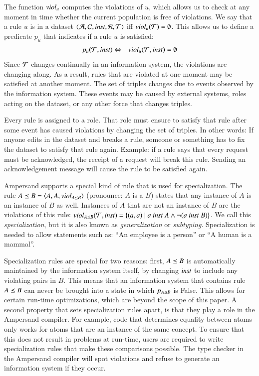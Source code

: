 \documentclass{elsarticle}
\begin{document}
   The function $\text{\it viol\/}_u$ computes the violations of $u$,
   which allows us to check at any moment in time whether the current population is free of violations.
   We say that a rule $u$ is  in a dataset $\langle\mathcal{A},\mathcal{C},\text{\it inst\/},\mathcal{R},\mathcal{T}\rangle$ iff $\text{\it viol\/}_{u}(\mathcal{T})=\emptyset$.
   This allows us to define a predicate $p_u$ that indicates if a rule $u$ is satisfied:
\begin{eqnarray}
   p_u(\mathcal{T},\text{\it inst\/})&\Leftrightarrow&\text{\it viol\/}_{u}(\mathcal{T},\text{\it inst\/})=\emptyset
\end{eqnarray}
   Since $\mathcal{T}$ changes continually in an information system, the violations are changing along.
   As a result, rules that are violated at one moment may be satisfied at another moment.
   The set of triples changes due to events observed by the information system.
   These events may be caused by external systems, roles acting on the dataset, or any other force that changes triples.
   
   Every rule is assigned to a role.
   That role must ensure to satisfy that rule after some event has caused violations by changing the set of triples.
   In other words: If anyone edits in the dataset and breaks a rule, someone or something has to fix the dataset to satisfy that rule again.
   Example: if a rule says that every request must be acknowledged, the receipt of a request will break this rule.
   Sending an acknowledgement message will cause the rule to be satisfied again.

   Ampersand supports a special kind of rule that is used for specialization.
   The rule $A\preceq B = \langle A, A, viol_{A\preceq B} \rangle$ (pronounce: $A$ is a $B$) states that any instance of $A$ is an instance of $B$ as well.
   Instances of $A$ that are not an instance of $B$ are the violations of this rule: $viol_{A\isa B}(\triples,\inst) = \{(a,a) \mid a\ \inst\ A \wedge \lnot (a\ \inst\ B)\}$.
   We call this {\em specialization}, but it is also known as {\em generalization} or {\em subtyping}.
   Specialization is needed to allow statements such as: ``An employee is a person'' or ``A human is a mammal''.
   
   Specialization rules are special for two reasons:
   first, $A\preceq B$ is automatically maintained by the information system itself, by changing $\text{\it inst\/}$ to include any violating pairs in $B$.
   This means that an information system that contains rule $A\preceq B$ can never be brought into a state in which $p_{A\preceq B}$ is False.
   This allows for certain run-time optimizations, which are beyond the scope of this paper.
   A second property that sets specialization rules apart, is that they play a role in the Ampersand compiler.
   For example, code that determines equality between atoms only works for atoms that are an instance of the same concept.
   To ensure that this does not result in problems at run-time, users are required to write specialization rules that make these comparisons possible.
   The type checker in the Ampersand compiler will spot violations and refuse to generate an information system if they occur.
\end{document}
